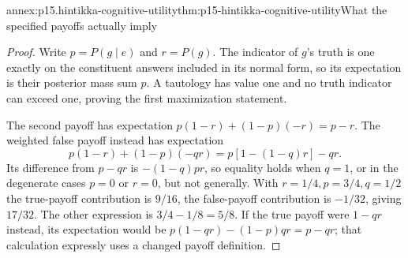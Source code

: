 \begin{annexitem}{annex:p15.hintikka-cognitive-utility}{thm:p15-hintikka-cognitive-utility}{What the specified payoffs actually imply}
\begin{proof}
Write \(p=P(g\mid e)\) and \(r=P(g)\). The indicator of
\(g\)'s truth is one exactly on the constituent answers included
in its normal form, so its expectation is their posterior mass sum
\(p\). A tautology has value one and no truth indicator can exceed
one, proving the first maximization statement.

The second payoff has expectation
\(p(1-r)+(1-p)(-r)=p-r\). The weighted false payoff instead has
expectation
\[
 p(1-r)+(1-p)(-qr)
   =p[1-(1-q)r]-qr.
\]
Its difference from \(p-qr\) is \(-(1-q)pr\), so equality
holds when \(q=1\), or in the degenerate cases \(p=0\) or
\(r=0\), but not generally. With \(r=1/4,p=3/4,q=1/2\)
the true-payoff contribution is \(9/16\), the false-payoff
contribution is \(-1/32\), giving \(17/32\). The other expression
is \(3/4-1/8=5/8\). If the true payoff were \(1-qr\) instead,
its expectation would be \(p(1-qr)-(1-p)qr=p-qr\); that
calculation expressly uses a changed payoff definition.
\end{proof}
\end{annexitem}

